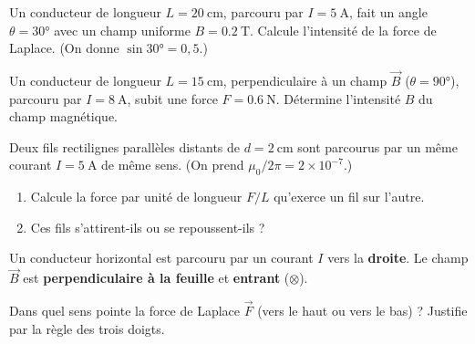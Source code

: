 \documentclass[11pt,a4paper]{article}
\newcommand{\vv}[1]{\vec{#1}}\newcommand{\ds}{\displaystyle}
\begin{document}
\begin{exo}
Un conducteur de longueur $L=\qty{20}{\centi\metre}$, parcouru par $I=\qty{5}{\ampere}$, fait un
angle $\theta=\ang{30}$ avec un champ uniforme $B=\qty{0.2}{\tesla}$. Calcule l'intensité de la
force de Laplace. (On donne $\sin\ang{30}=0{,}5$.)
\end{exo}

\begin{exo}
Un conducteur de longueur $L=\qty{15}{\centi\metre}$, perpendiculaire à un champ $\vv{B}$
($\theta=\ang{90}$), parcouru par $I=\qty{8}{\ampere}$, subit une force $F=\qty{0.6}{\newton}$.
Détermine l'intensité $B$ du champ magnétique.
\end{exo}

\begin{exo}
Deux fils rectilignes parallèles distants de $d=\qty{2}{\centi\metre}$ sont parcourus par un même
courant $I=\qty{5}{\ampere}$ de même sens. (On prend $\mu_0/2\pi=2\times10^{-7}$.)
\begin{enumerate}[label=\alph*)]
  \item Calcule la force par unité de longueur $F/L$ qu'exerce un fil sur l'autre.
  \item Ces fils s'attirent-ils ou se repoussent-ils ?
\end{enumerate}
\end{exo}

\begin{exo}[sens de la force avec $\vv{B}$ entrant]
Un conducteur horizontal est parcouru par un courant $I$ vers la \textbf{droite}. Le champ $\vv{B}$
est \textbf{perpendiculaire à la feuille} et \textbf{entrant} ($\otimes$).
\begin{center}
\end{center}
Dans quel sens pointe la force de Laplace $\vv{F}$ (vers le haut ou vers le bas) ? Justifie par la
règle des trois doigts.
\end{exo}
\end{document}
